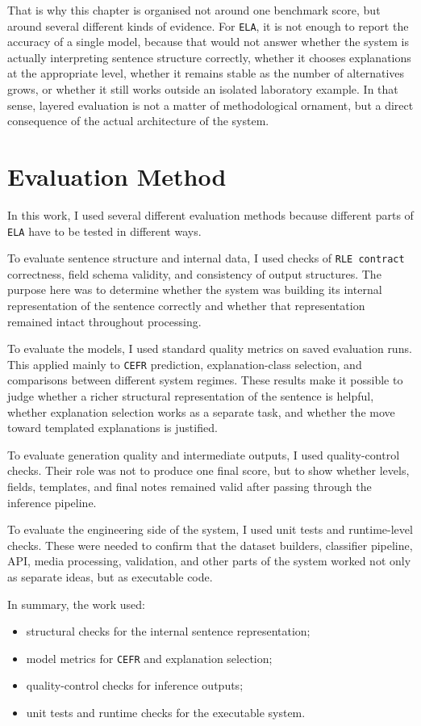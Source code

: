 \documentclass[12pt,a4paper,oneside]{report}
\begin{document}
That is why this chapter is organised not around one benchmark score, but around several different kinds of evidence. For \texttt{ELA}, it is not enough to report the accuracy of a single model, because that would not answer whether the system is actually interpreting sentence structure correctly, whether it chooses explanations at the appropriate level, whether it remains stable as the number of alternatives grows, or whether it still works outside an isolated laboratory example. In that sense, layered evaluation is not a matter of methodological ornament, but a direct consequence of the actual architecture of the system.

\section{Evaluation Method}
In this work, I used several different evaluation methods because different parts of \texttt{ELA} have to be tested in different ways.

To evaluate sentence structure and internal data, I used checks of \texttt{RLE contract} correctness, field schema validity, and consistency of output structures. The purpose here was to determine whether the system was building its internal representation of the sentence correctly and whether that representation remained intact throughout processing.

To evaluate the models, I used standard quality metrics on saved evaluation runs. This applied mainly to \texttt{CEFR} prediction, explanation-class selection, and comparisons between different system regimes. These results make it possible to judge whether a richer structural representation of the sentence is helpful, whether explanation selection works as a separate task, and whether the move toward templated explanations is justified.

To evaluate generation quality and intermediate outputs, I used quality-control checks. Their role was not to produce one final score, but to show whether levels, fields, templates, and final notes remained valid after passing through the inference pipeline.

To evaluate the engineering side of the system, I used unit tests and runtime-level checks. These were needed to confirm that the dataset builders, classifier pipeline, API, media processing, validation, and other parts of the system worked not only as separate ideas, but as executable code.

In summary, the work used:
\begin{itemize}
  \item structural checks for the internal sentence representation;
  \item model metrics for \texttt{CEFR} and explanation selection;
  \item quality-control checks for inference outputs;
  \item unit tests and runtime checks for the executable system.
\end{itemize}
\end{document}
